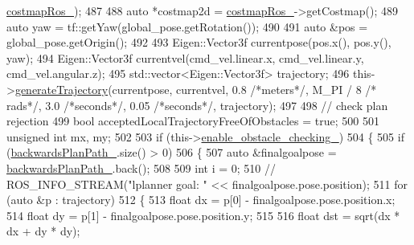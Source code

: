 \begin{DoxyCode}
{      \hyperlink{classcl__move__base__z_1_1backward__local__planner_1_1BackwardLocalPlanner_a4136268882a105d9e06e173d85d5c0dc}{costmapRos\_});
487 
488             \textcolor{keyword}{auto} *costmap2d = \hyperlink{classcl__move__base__z_1_1backward__local__planner_1_1BackwardLocalPlanner_a4136268882a105d9e06e173d85d5c0dc}{costmapRos\_}->getCostmap();
489             \textcolor{keyword}{auto} yaw = tf::getYaw(global\_pose.getRotation());
490 
491             \textcolor{keyword}{auto} &pos = global\_pose.getOrigin();
492 
493             Eigen::Vector3f currentpose(pos.x(), pos.y(), yaw);
494             Eigen::Vector3f currentvel(cmd\_vel.linear.x, cmd\_vel.linear.y, cmd\_vel.angular.z);
495             std::vector<Eigen::Vector3f> trajectory;
496             this->\hyperlink{classcl__move__base__z_1_1backward__local__planner_1_1BackwardLocalPlanner_a9e8921ca8ce379ca8ba321f82ca23cdc}{generateTrajectory}(currentpose, currentvel, 0.8 \textcolor{comment}{/*meters*/}, M\_PI / 8 \textcolor{comment}{/*
      rads*/}, 3.0 \textcolor{comment}{/*seconds*/}, 0.05 \textcolor{comment}{/*seconds*/}, trajectory);
497 
498             \textcolor{comment}{// check plan rejection}
499             \textcolor{keywordtype}{bool} acceptedLocalTrajectoryFreeOfObstacles = \textcolor{keyword}{true};
500 
501             \textcolor{keywordtype}{unsigned} \textcolor{keywordtype}{int} mx, my;
502 
503             \textcolor{keywordflow}{if} (this->\hyperlink{classcl__move__base__z_1_1backward__local__planner_1_1BackwardLocalPlanner_a154043366660cc02ec758dda32817511}{enable\_obstacle\_checking\_})
504             \{
505                 \textcolor{keywordflow}{if} (\hyperlink{classcl__move__base__z_1_1backward__local__planner_1_1BackwardLocalPlanner_ad9cde5c85f782cab2ddb4030e3c3f2cf}{backwardsPlanPath\_}.size() > 0)
506                 \{
507                     \textcolor{keyword}{auto} &finalgoalpose = \hyperlink{classcl__move__base__z_1_1backward__local__planner_1_1BackwardLocalPlanner_ad9cde5c85f782cab2ddb4030e3c3f2cf}{backwardsPlanPath\_}.back();
508 
509                     \textcolor{keywordtype}{int} i = 0;
510                     \textcolor{comment}{// ROS\_INFO\_STREAM("lplanner goal: " << finalgoalpose.pose.position);}
511                     \textcolor{keywordflow}{for} (\textcolor{keyword}{auto} &p : trajectory)
512                     \{
513                         \textcolor{keywordtype}{float} dx = p[0] - finalgoalpose.pose.position.x;
514                         \textcolor{keywordtype}{float} dy = p[1] - finalgoalpose.pose.position.y;
515 
516                         \textcolor{keywordtype}{float} dst = sqrt(dx * dx + dy * dy);
}
\end{DoxyCode}
